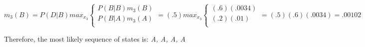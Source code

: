 \documentclass[fleqn]{hermans-hw}
\begin{document}
\begin{enumerate}
	$m_3(B) = P(D|B) max_{x_3}
	\begin{cases} 
	P(B|B) m_3(B) \\
	P(B|A) m_3(A) \\
	\end{cases}
	=
	(.5) max_{x_3} \begin{cases} 
	(.6) (.0034) \\
	(.2) (.01) \\
	\end{cases} = (.5)(.6)(.0034) = .00102
	$
	
	\bigbreak
	
	Therefore, the most likely sequence of states is: \textit{A, A, A, A}
	  
\end{enumerate}
\end{document}
